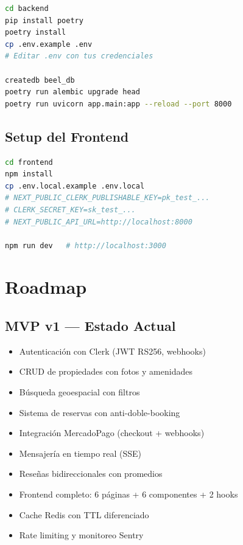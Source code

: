 \documentclass[12pt,a4paper]{report}
\begin{document}
\begin{lstlisting}[language=bash, caption={Iniciar el backend}]
cd backend
pip install poetry
poetry install
cp .env.example .env
# Editar .env con tus credenciales

createdb beel_db
poetry run alembic upgrade head
poetry run uvicorn app.main:app --reload --port 8000
\end{lstlisting}

\section{Setup del Frontend}

\begin{lstlisting}[language=bash, caption={Iniciar el frontend}]
cd frontend
npm install
cp .env.local.example .env.local
# NEXT_PUBLIC_CLERK_PUBLISHABLE_KEY=pk_test_...
# CLERK_SECRET_KEY=sk_test_...
# NEXT_PUBLIC_API_URL=http://localhost:8000

npm run dev   # http://localhost:3000
\end{lstlisting}

\chapter{Roadmap}

\section{MVP v1 --- Estado Actual}

\begin{itemize}[leftmargin=*, label=$\checkmark$]
  \item Autenticaci\'on con Clerk (JWT RS256, webhooks)
  \item CRUD de propiedades con fotos y amenidades
  \item B\'usqueda geoespacial con filtros
  \item Sistema de reservas con anti-doble-booking
  \item Integraci\'on MercadoPago (checkout + webhooks)
  \item Mensajer\'ia en tiempo real (SSE)
  \item Rese\~nas bidireccionales con promedios
  \item Frontend completo: 6 p\'aginas + 6 componentes + 2 hooks
  \item Cache Redis con TTL diferenciado
  \item Rate limiting y monitoreo Sentry
\end{itemize}
\end{document}
